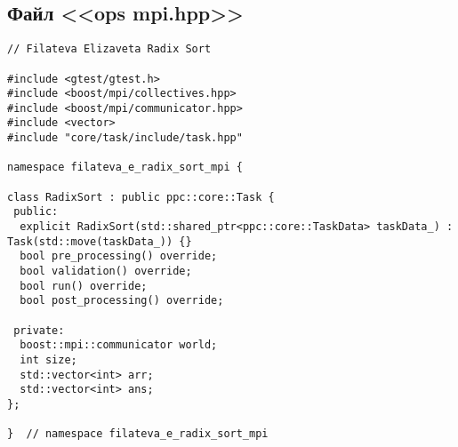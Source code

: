 \documentclass[a4paper, 14pt]{article}
\begin{document}
	\newpage
	\subsection*{\centering Файл <<ops mpi.hpp>>}
	\begin{verbatim}
// Filateva Elizaveta Radix Sort

#include <gtest/gtest.h>
#include <boost/mpi/collectives.hpp>
#include <boost/mpi/communicator.hpp>
#include <vector>
#include "core/task/include/task.hpp"

namespace filateva_e_radix_sort_mpi {

class RadixSort : public ppc::core::Task {
 public:
  explicit RadixSort(std::shared_ptr<ppc::core::TaskData> taskData_) : Task(std::move(taskData_)) {}
  bool pre_processing() override;
  bool validation() override;
  bool run() override;
  bool post_processing() override;

 private:
  boost::mpi::communicator world;
  int size;
  std::vector<int> arr;
  std::vector<int> ans;
};

}  // namespace filateva_e_radix_sort_mpi

	\end{verbatim}




    \newpage
\end{document}
